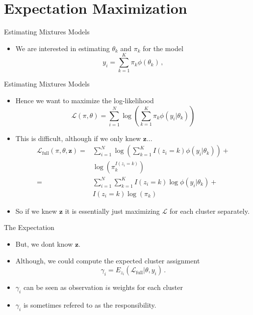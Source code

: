 \documentclass[10pt]{beamer}
\begin{document}
\section{Expectation Maximization}


\begin{frame}{Estimating Mixtures Models}

\begin{itemize}
\item We are interested in estimating $\theta_k$ and $\pi_k$ for the model
\[
y_i = \sum_{k=1}^K \pi_k \phi(\theta_k)\,,
\]
\end{itemize}

\end{frame}


\begin{frame}{Estimating Mixtures Models}

\begin{itemize}
\item Hence we want to maximize the log-likelihood
\[
\mathcal{L}(\pi, \theta) = \sum^N_{i=1} \log \left( \sum_{k=1}^K \pi_k \phi(y_i|\theta_k)\right)
\]
\item This is difficult, although {\color{uured} if we only knew $\mathbf{z}$}...\pause
\begin{align*}
\mathcal{L}_{\text{full}}(\pi, \theta, \mathbf{z}) =& \sum^N_{i=1} \log \left( \sum_{k=1}^K I(z_i=k) \phi(y_i|\theta_k)\right) + \\
& \log(\pi_k^{I(z_i=k)})\\
=& \sum^N_{i=1} \sum_{k=1}^K I(z_i=k) \log \phi(y_i|\theta_k) + \\
& I(z_i=k) \log(\pi_k)
\end{align*}
\item So if we knew $\mathbf{z}$ it is essentially just maximizing $\mathcal{L}$ for each cluster separately.

\end{itemize}

\end{frame}


\begin{frame}{The Expectation}

\begin{itemize}
\item But, we dont know $\mathbf{z}$.\pause
\item Although, we could compute the {\color{uured} expected} cluster assignment
\[
\gamma_{i} = E_{z_i} (\mathcal{L}_{\text{full}}|\theta, y_i)\,.
\]
\item $\gamma_{i}$ can be seen as observation $i$s {\color{uured} weights} for each cluster
\item $\gamma_{i}$ is sometimes refered to as the {\color{uured} responsibility}.
\end{itemize}

\end{frame}
\end{document}
